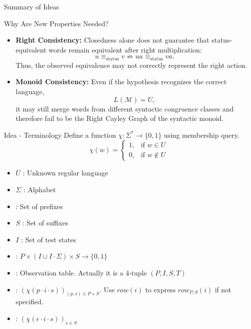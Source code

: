\documentclass{beamer}
\begin{document}
\begin{frame}{Summary of Ideas}
    \begin{alertblock}{Why Are New Properties Needed?}
        \begin{itemize}
            \item \textbf{Right Consistency:}
            Closedness alone does not guarantee that
            status-equivalent words remain equivalent after
            right multiplication:
            \[
                u \equiv_{\mathrm{status}} v
                \not\Rightarrow
                ua \equiv_{\mathrm{status}} va.
            \]
            Thus, the observed equivalence may not correctly
            represent the right action.

            \item \textbf{Monoid Consistency:}
            Even if the hypothesis recognizes the correct language,
            \[
                L(\mathcal{M})=U,
            \]
            it may still merge words from different syntactic
            congruence classes and therefore fail to be the
            Right Cayley Graph of the syntactic monoid.
        \end{itemize}
    \end{alertblock}
\end{frame}

\begin{frame}{Idea - Terminology}
    Define a function $\chi: \Sigma^* \to \{0,1\}$ using membership query. 
    \[
    \chi(w) = \begin{cases} 
        1, & \text{if } w \in U \\ 
        0, & \text{if } w \notin U 
    \end{cases}
    \]
    \begin{itemize}
        \item $U$ : Unknown regular language
        \item $\Sigma$ : Alphabet
        \item \textbf{\color{red}{$P$}} : Set of prefixes
        \item $S$ : Set of suffixes
        \item $I$ : Set of test states
        \item \textbf{\color{red}{$T$}}: $P\times (I \cup I \cdot \Sigma) \times S \to \{0,1\}$
        \item \textbf{\color{red}{$OT$}} : {\small Observation table. Actually it is a 4-tuple} $(P,I,S,T)$
        \item \textbf{}: $(\chi(p\cdot i \cdot s))_{(p,s) \in P \times S}$. Use $row(i)$ to express $row_{P,S}(i)$ if not specified.
        \item \textbf{}: $(\chi(\epsilon \cdot i \cdot s))_{s \in S}$
    \end{itemize}    
\end{frame}
\end{document}
